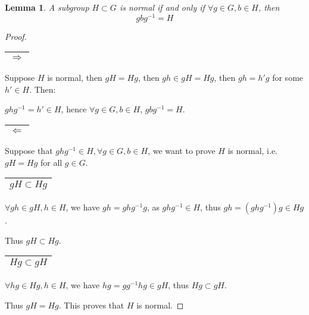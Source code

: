 \documentclass{article}
\theoremstyle{MyNonumberplain}
\theoremstyle{break}
\newtheorem*{proof}{Proof. }
\theoremstyle{break}
\newtheorem{lemma}[theorem]{Lemma}
\theoremstyle{break}
\theoremstyle{definition}
\theoremstyle{break}
\begin{document}
\begin{thmbox}
    \begin{lemma}
        A subgroup $H \subset G$ is normal if and only if $\forall g \in G, b \in H$,
        then
        \[ g b g^{- 1} = H \]
    \end{lemma}
    \begin{prfbox}
        \begin{proof}
            \begin{tabular}{|c|}
                \hline
                $\Rightarrow$\\
                \hline
              \end{tabular}\bigskip
              
              Suppose $H$ is normal, then $g H = H g$, then $g h \in g H = H g$, then $g h =
              h' g$ for some $h' \in H$. Then:\bigskip
              
              $g h g^{- 1} = h' \in H$, hence $\forall g \in G, b \in H$, $g b g^{- 1} =
              H$.\bigskip
              
              \begin{tabular}{|c|}
                \hline
                $\Leftarrow$\\
                \hline
              \end{tabular}\bigskip
              
              Suppose that $g h g^{- 1} \in H, \forall g \in G, b \in H$, we want to prove
              $H$ is normal, i.e. $g H = H g$ for all $g \in G$.\bigskip
              
              \begin{tabular}{|c|}
                \hline
                $g H \subset H g$\\
                \hline
              \end{tabular}\bigskip
              
              $\forall g h \in g H, h \in H$, we have $g h = g h g^{- 1} g$, as $g h g^{- 1}
              \in H$, thus $g h = (g h g^{- 1}) g \in H g$.\bigskip
              
              Thus $g H \subset H g$.\bigskip
              
              \begin{tabular}{|c|}
                \hline
                $H g \subset g H$\\
                \hline
              \end{tabular}\bigskip
              
              $\forall h g \in H g, h \in H$, we have $h g = g g^{- 1} h g \in g H$, thus $H
              g \subset g H$.\bigskip
              
              Thus $g H = H g$. This proves that $H$ is normal.
        \end{proof}
    \end{prfbox}
\end{thmbox}
\end{document}

